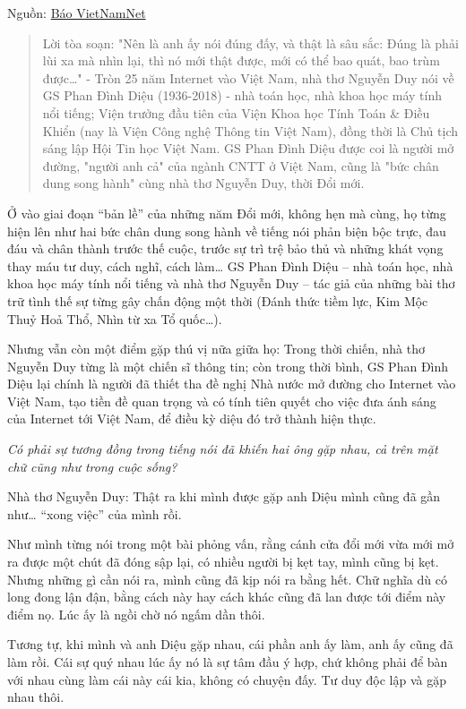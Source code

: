 Nguồn: \href{https://vietnamnet.vn/nguyen-duy-phan-dinh-dieu-nhin-xa-de-hieu-gan-i5002796.html}{Báo VietNamNet}

\begin{quote}
Lời tòa soạn: "Nên là anh ấy nói đúng đấy, và thật là sâu sắc: Đúng là phải lùi xa mà nhìn lại, thì nó mới thật được, mới có thể bao quát, bao trùm được…" - Tròn 25 năm Internet vào Việt Nam, nhà thơ Nguyễn Duy nói về GS Phan Đình Diệu (1936-2018) -  nhà toán học, nhà khoa học máy tính nổi tiếng; Viện trưởng đầu tiên của Viện Khoa học Tính Toán \& Điều Khiển (nay là Viện Công nghệ Thông tin Việt Nam), đồng thời là Chủ tịch sáng lập Hội Tin học Việt Nam. GS Phan Đình Diệu được coi là người mở đường, "người anh cả" của ngành CNTT ở Việt Nam, cũng là "bức chân dung song hành" cùng nhà thơ Nguyễn Duy, thời Đổi mới.
\end{quote}


Ở vào giai đoạn “bản lề” của những năm Đổi mới, không hẹn mà cùng, họ từng hiện lên như hai bức chân dung song hành về tiếng nói phản biện bộc trực, đau đáu và chân thành trước thế cuộc, trước sự trì trệ bảo thủ và những khát vọng thay máu tư duy, cách nghĩ, cách làm… GS Phan Đình Diệu – nhà toán học, nhà khoa học máy tính nổi tiếng và nhà thơ Nguyễn Duy – tác giả của những bài thơ trữ tình thế sự từng gây chấn động một thời (Đánh thức tiềm lực, Kim Mộc Thuỷ Hoả Thổ, Nhìn từ xa Tổ quốc…).


Nhưng vẫn còn một điểm gặp thú vị nữa giữa họ: Trong thời chiến, nhà thơ Nguyễn Duy từng là một chiến sĩ thông tin; còn trong thời bình, GS Phan Đình Diệu lại chính là người đã thiết tha đề nghị Nhà nước mở đường cho Internet vào Việt Nam, tạo tiền đề quan trọng và có tính tiên quyết cho việc đưa ánh sáng của Internet tới Việt Nam, để điều kỳ diệu đó trở thành hiện thực.


\emph{Có phải sự tương đồng trong tiếng nói đã khiến hai ông gặp nhau, cả trên mặt chữ cũng như trong cuộc sống?}

Nhà thơ Nguyễn Duy: Thật ra khi mình được gặp anh Diệu mình cũng đã gần như… “xong việc” của mình rồi.

Như mình từng nói trong một bài phỏng vấn, rằng cánh cửa đổi mới vừa mới mở ra được một chút đã đóng sập lại, có nhiều người bị kẹt tay, mình cũng bị kẹt. Nhưng những gì cần nói ra, mình cũng đã kịp nói ra bằng hết. Chữ nghĩa dù có long đong lận đận, bằng cách này hay cách khác cũng đã lan được tới điểm này điểm nọ. Lúc ấy là ngồi chờ nó ngấm dần thôi.


Tương tự, khi mình và anh Diệu gặp nhau, cái phần anh ấy làm, anh ấy cũng đã làm rồi. Cái sự quý nhau lúc ấy nó là sự tâm đầu ý hợp, chứ không phải để bàn với nhau cùng làm cái này cái kia, không có chuyện đấy. Tư duy độc lập và gặp nhau thôi. 

